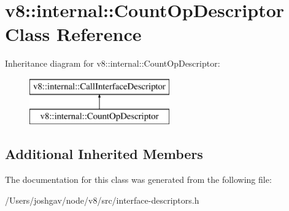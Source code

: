 \hypertarget{classv8_1_1internal_1_1_count_op_descriptor}{}\section{v8\+:\+:internal\+:\+:Count\+Op\+Descriptor Class Reference}
\label{classv8_1_1internal_1_1_count_op_descriptor}
Inheritance diagram for v8\+:\+:internal\+:\+:Count\+Op\+Descriptor\+:\begin{figure}[H]
\begin{center}
\leavevmode
\includegraphics[height=2.000000cm]{classv8_1_1internal_1_1_count_op_descriptor}
\end{center}
\end{figure}
\subsection*{Additional Inherited Members}


The documentation for this class was generated from the following file\+:\begin{DoxyCompactItemize}
\item 
/\+Users/joshgav/node/v8/src/interface-\/descriptors.\+h\end{DoxyCompactItemize}
